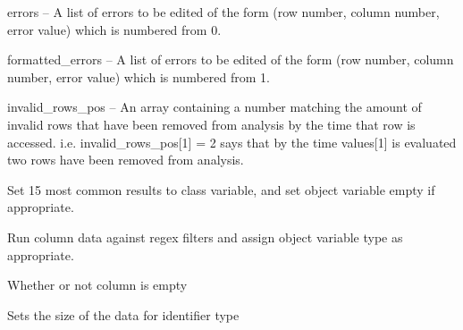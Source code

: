 \documentclass[letterpaper,10pt,english]{sphinxmanual}
\begin{document}
\begin{fulllineitems}
\begin{fulllineitems}
\begin{description}
errors -- A list of errors to be edited of the form (row number, column number,
error value) which is numbered from 0.

formatted\_errors -- A list of errors to be edited of the form (row number, column
number, error value) which is numbered from 1.

invalid\_rows\_pos -- An array containing a number matching the amount of invalid
rows that have been removed from analysis by the time that row is accessed. i.e.
invalid\_rows\_pos{[}1{]} = 2 says that by the time values{[}1{]} is evaluated two rows have
been removed from analysis.

\end{description}

\end{fulllineitems}


\begin{fulllineitems}
\label{Code_rst/dat:data.Column.define_most_least_common}
Set 15 most common results to class variable, and set object variable 
empty if appropriate.

\end{fulllineitems}


\begin{fulllineitems}
\label{Code_rst/dat:data.Column.define_type}
Run column data against regex filters and assign object variable type
as appropriate.

\end{fulllineitems}


\begin{fulllineitems}
\label{Code_rst/dat:data.Column.is_Empty}
Whether or not column is empty

\end{fulllineitems}


\begin{fulllineitems}
\label{Code_rst/dat:data.Column.set_Identifier_size}
Sets the size of the data for identifier type


\end{fulllineitems}
\end{fulllineitems}
\end{document}

